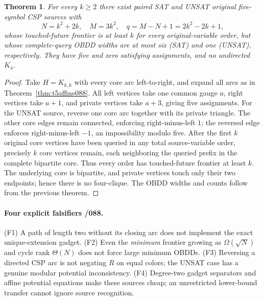 \documentclass[11pt]{article}
\newtheorem{theorem}{Theorem}
\begin{document}
\begin{theorem}\label{thm:t5frontier088}
For every $k\ge2$ there exist paired SAT and UNSAT
original five-symbol CSP sources with
\[
N=k^2+2k,\quad M=3k^2,\quad
q=M-N+1=2k^2-2k+1,
\]
whose touched-future frontier is at least $k$ for
\emph{every} original-variable order, but whose
complete-query OBDD widths are at most six (SAT)
and one (UNSAT), respectively. They have five
and zero satisfying assignments, and no undirected $K_4$.
\end{theorem}
\begin{proof}
Take $H=K_{k,k}$ with every core arc left-to-right,
and expand all arcs as in Theorem~\ref{thm:t5affine088}.
All left vertices take one common gauge $a$,
right vertices take $a+1$, and private vertices take
$a+3$, giving five assignments.
For the UNSAT source, reverse one core arc together
with its private triangle. The other core edges
remain connected, enforcing right-minus-left $1$;
the reversed edge enforces right-minus-left $-1$,
an impossibility modulo five.
After the first $k$ original core vertices have been
queried in any total source-variable order, precisely
$k$ core vertices remain, each neighboring the queried
prefix in the complete bipartite core. Thus every
order has touched-future frontier at least $k$.
The underlying core is bipartite, and private vertices
touch only their two endpoints; hence there is no
four-clique. The OBDD widths and counts follow from
the previous theorem.
\end{proof}
\paragraph{Four explicit falsifiers /088.}
(F1) A path of length two without its closing arc
does not implement the exact unique-extension gadget.
(F2) Even the \emph{minimum} frontier growing as
$\Omega(\sqrt N)$ and cycle rank $\Theta(N)$ does
not force large minimum OBDDs.
(F3) Reversing a directed CSP arc is not negating
$R$ on equal colors; the UNSAT case has a genuine
modular potential inconsistency.
(F4) Degree-two gadget separators and affine
potential equations make these sources cheap;
an unrestricted lower-bound transfer cannot
ignore source recognition.
\end{document}
